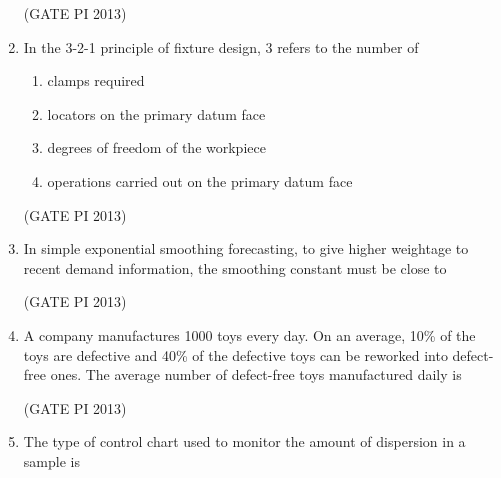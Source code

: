 \documentclass[journal,12pt,onecolumn]{IEEEtran}
\theoremstyle{remark}
\begin{document}
\begin{enumerate}
\hfill (GATE PI 2013)

\item In the 3-2-1 principle of fixture design, 3 refers to the number of
\begin{enumerate}
\item clamps required
\item locators on the primary datum face
\item degrees of freedom of the workpiece
\item operations carried out on the primary datum face 
\end{enumerate}

\hfill (GATE PI 2013)

\item In simple exponential smoothing forecasting, to give higher weightage to recent demand information, the smoothing constant must be close to

\begin{enumerate}
\end{enumerate}

\hfill (GATE PI 2013)

\item A company manufactures 1000 toys every day. On an average, 10\% of the toys are defective and 40\% of the defective toys can be reworked into defect-free ones. The average number of defect-free toys manufactured daily is 

\begin{enumerate}
\end{enumerate}

\hfill (GATE PI 2013)

\item The type of control chart used to monitor the amount of dispersion in a sample is

\begin{enumerate}
\end{enumerate}


\end{enumerate}
\end{document}
